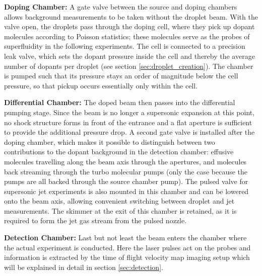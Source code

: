 \textbf{Doping Chamber:} A gate valve between the source and doping chambers allows background measurements to be taken without the droplet beam. With the valve open, the droplets pass through the doping cell, where they pick up dopant molecules according to Poisson statistics; these molecules serve as the probes of superfluidity in the following experiments. The cell is connected to a precision leak valve, which sets the dopant pressure inside the cell and thereby the average number of dopants per droplet (see section \ref{sec:droplet_creation}). The chamber is pumped such that its pressure stays an order of magnitude below the cell pressure, so that pickup occurs essentially only within the cell.

\textbf{Differential Chamber:} The doped beam then passes into the differential pumping stage. Since the beam is no longer a supersonic expansion at this point, no shock structure forms in front of the entrance and a flat aperture is sufficient to provide the additional pressure drop. A second gate valve is installed after the doping chamber, which makes it possible to distinguish between two contributions to the dopant background in the detection chamber: effusive molecules travelling along the beam axis through the apertures, and molecules back streaming through the turbo molecular pumps (only the case because the pumps are all backed through the source chamber pump). The pulsed valve for supersonic jet experiments is also mounted in this chamber and can be lowered onto the beam axis, allowing convenient switching between droplet and jet measurements. The skimmer at the exit of this chamber is retained, as it is required to form the jet gas stream from the pulsed nozzle.

\textbf{Detection Chamber:} Last but not least the beam enters the chamber where the actual experiment is conducted. Here the laser pulses act on the probes and information is extracted by the time of flight velocity map imaging setup which will be explained in detail in section \ref{sec:detection}.

